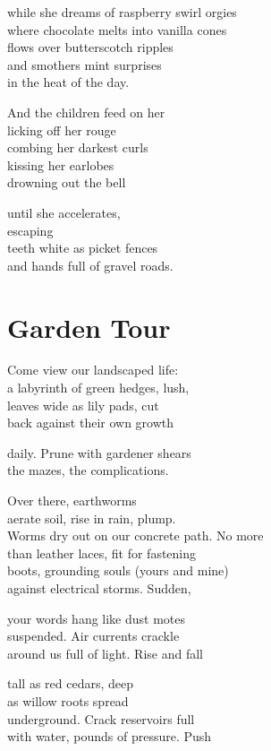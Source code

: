 \documentclass[twoside,10pt]{book}
\begin{document}
while she dreams of raspberry swirl orgies\\
where chocolate melts into vanilla cones\\
flows over butterscotch ripples\\
and smothers mint surprises\\
in the heat of the day.

And the children feed on her\\
licking off her rouge\\
combing her darkest curls\\
kissing her earlobes\\
drowning out the bell

until she accelerates,\\
escaping\\
teeth white as picket fences\\
and hands full of gravel roads.


\clearpage
\section{Garden Tour}

Come view our landscaped life:\\
a labyrinth of green hedges, lush,\\
leaves wide as lily pads, cut\\
back against their own growth

daily. Prune with gardener shears\\
the mazes, the complications.

Over there, earthworms\\
aerate soil, rise in rain, plump.\\
Worms dry out on our concrete path. No more\\
than leather laces, fit for fastening\\
boots, grounding souls (yours and mine)\\
against electrical storms. Sudden,

your words hang like dust motes\\
suspended. Air currents crackle\\
around us full of light. Rise and fall

tall as red cedars, deep\\
as willow roots spread\\
underground. Crack reservoirs full\\
with water, pounds of pressure. Push
\end{document}
